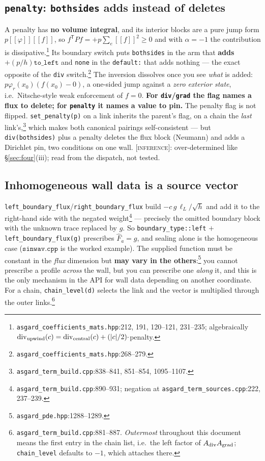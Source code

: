 \documentclass[10pt]{article}
\newcommand{\code}[1]{\texttt{#1}}
\newcommand{\jump}[1]{[\![#1]\!]}
\newcommand{\hF}{\widehat{F}}
\newcommand{\INF}{\textcolor{red!60!black}{\textsc{[inference]}}}
\newcommand{\fl}[2]{\texttt{#1}:#2}
\begin{document}
\subsection{\code{penalty}: \code{bothsides} adds instead of deletes}
\label{sec:penalty}

A penalty has \textbf{no volume integral}, and its interior blocks are a pure
jump form $p\jump{\varphi}\jump{f}$, so $f^{\mathsf T}Pf=+p\sum_e\jump f^2\ge0$
and with $\alpha=-1$ the contribution is
dissipative.\footnote{\fl{asgard\_coefficients\_mats.hpp}{212, 191, 120--121,
231--235}; algebraically
$\mathrm{div}_{\rm upwind}(c)=\mathrm{div}_{\rm central}(c)+(|c|/2)\cdot$penalty.}
Its boundary switch puts \code{bothsides} in the arm that \textbf{adds}
$+(p/h)\code{to\_left}$ and \code{none} in the \code{default:} that adds
nothing --- the exact opposite of the \code{div}
switch.\footnote{\fl{asgard\_coefficients\_mats.hpp}{268--279}.} The inversion
dissolves once you see \emph{what} is added: $p\varphi_r(x_0)(f(x_0)-0)$, a
one-sided jump against a \emph{zero exterior state}, i.e.\ Nitsche-style weak
enforcement of $f=0$. \textbf{For \code{div}/\code{grad} the flag names a flux to
delete; for \code{penalty} it names a value to pin.} The penalty flag is not
flipped. \code{set\_penalty(p)} on a link inherits the parent's flag, on a chain
the \emph{last} link's,\footnote{\fl{asgard\_term\_build.cpp}{838--841,
851--854, 1095--1107}.} which makes both canonical pairings self-consistent ---
but \code{div(bothsides)} plus a penalty deletes the flux block (Neumann) and
adds a Dirichlet pin, two conditions on one wall. \INF{}: over-determined like
\S\ref{sec:four}(iii); read from the dispatch, not tested.

\subsection{Inhomogeneous wall data is a source vector}
\label{sec:inhom}

\code{left\_boundary\_flux}/\code{right\_boundary\_flux} build
$-c\,g\,\ell_L/\sqrt h$ and add it to the right-hand side with the negated
weight\footnote{\fl{asgard\_term\_build.cpp}{890--931}; negation at
\fl{asgard\_term\_sources.cpp}{222, 237--239}.} --- precisely the omitted boundary
block with the unknown trace replaced by $g$. So \code{boundary\_type::left} $+$
\code{left\_boundary\_flux(g)} prescribes $\hF_a=g$, and sealing alone is the
homogeneous case ($\code{sinwav.cpp}$ is the worked example). The supplied
function must be constant in the \emph{flux} dimension but \textbf{may vary in
the others}:\footnote{\fl{asgard\_pde.hpp}{1288--1289}.} you cannot prescribe a
profile \emph{across} the wall, but you can prescribe one \emph{along} it, and
this is the only mechanism in the API for wall data depending on another
coordinate. For a chain, \code{chain\_level(d)} selects the link and the vector is
multiplied through the outer links.\footnote{\fl{asgard\_term\_build.cpp}{881--887}.
\emph{Outermost} throughout this document means the first entry in the chain
list, i.e.\ the left factor of $A_{\rm div}A_{\rm grad}$; \code{chain\_level}
defaults to $-1$, which attaches there.}
\end{document}
